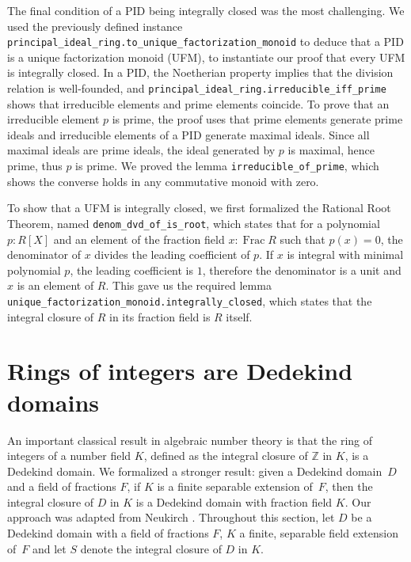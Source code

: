 \documentclass[sn-mathphys]{sn-jnl}%
\newcommand{\lean}[1]{\texttt{#1}\xspace}
\renewcommand{\Z}{\mathbb{Z}}
\DeclareMathOperator{\Frac}{Frac}
\begin{document}
The final condition of a PID being integrally closed was the most challenging.
We used the previously defined instance \lean{principal\_ideal\_ring.to\_\-unique\-\_factorization\_monoid} to deduce that a PID is a unique factorization monoid (UFM),
to instantiate our proof that every UFM is integrally closed.
In a PID, the Noetherian property implies that the division relation is well-founded,
and \lean{principal\_ideal\_ring.irreducible\_iff\_prime} shows that irreducible elements and prime elements coincide.
To prove that an irreducible element $p$ is prime, the proof uses that prime elements generate prime ideals and irreducible elements of a PID generate maximal ideals. Since all maximal ideals are prime ideals, the ideal generated by $p$ is maximal, hence prime, thus $p$ is prime.
We proved the lemma \lean{irreducible\_of\_prime}, which shows the converse holds in any commutative monoid with zero.

To show that a UFM is integrally closed, we first formalized the Rational Root Theorem, named \lean{denom\_dvd\_of\_is\_root},
which states that for a polynomial $p : R[X]$ and an element of the fraction field $x : \Frac R$ such that $p(x) = 0$, the denominator of $x$ divides the leading coefficient of $p$.
If $x$ is integral with minimal polynomial $p$, the leading coefficient is $1$, therefore the denominator is a unit and $x$ is an element of $R$.
This gave us the required lemma \lean{unique\_factorization\_monoid.integrally\_closed}, which states that the integral closure of $R$ in its fraction field is $R$ itself.

\section{Rings of integers are Dedekind domains} \label{sec:integral-closure}

An important classical result in algebraic number theory is that the ring of integers of a number field $K$, defined as the integral closure of $\Z$ in $K$, is a Dedekind domain. We formalized a stronger result: given a Dedekind domain~$D$ and a field of fractions $F$, if $K$ is a finite separable extension of~$F$, then the integral closure of $D$ in $K$ is a Dedekind domain with fraction field $K$.
Our approach was adapted from Neukirch \cite[Theorem~3.1]{Neukirch}.
Throughout this section, let $D$ be a Dedekind domain with a field of fractions $F$, $K$ a finite, separable field extension of~$F$ and let $S$ denote the integral closure of $D$ in $K$.
\end{document}
